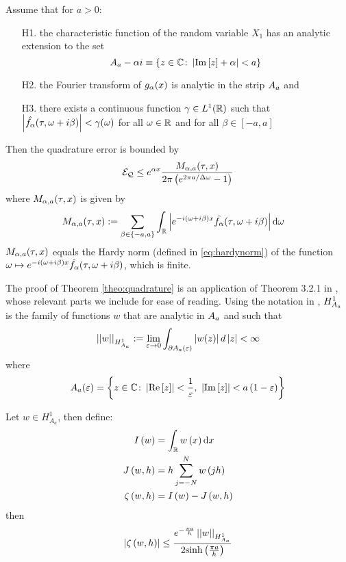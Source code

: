 \documentclass[11pt]{amsart}
\begin{document}
\begin{theorem}\label{theo:quadrature} 
Assume that for $a > 0$:
\begin{itemize}
\item[H1.] the characteristic function of the random variable $X_1$ has an analytic extension to the set $$A_{a}-\alpha i \equiv \left\{z\in \mathbb{C} \colon \left| {\mathrm{Im}\left[z\right]+\alpha} \right|<a\right\}$$
\item[H2.] the Fourier transform of $g_{\alpha}(x)$ is analytic in the strip $A_{a}$ and
\item[H3.] there exists a continuous function $\gamma \in L^1(\mathbb{R})$ such that  $\left| {\hat{f_{\alpha}}(\tau,\omega+i \beta)} \right|<\gamma(\omega)$ for all $\omega\in \mathbb{R}$ and for all $\beta \in [-a,a]$
\end{itemize}
Then the quadrature error is bounded by
\begin{equation*}
\mathcal{E_Q} \leq e^{\alpha x} \frac{M_{\alpha,a}(\tau,x) }{2\pi\left( {e^{2\pi a/\Delta\omega}-1} \right)}
\end{equation*}
where $M_{\alpha,a}(\tau,x)$ is given by
\begin{align}\label{eq:defM}
M_{\alpha,a}(\tau,x)&:=\sum_{\beta \in \{-a,a\}}\int_{\mathbb{R}}\left| {e^{-i\left( {\omega + i\beta} \right) x}\hat{f_{\alpha}}(\tau,\omega+i \beta)} \right| \textrm{d} \omega
\end{align}
$M_{\alpha,a}(\tau,x)$ equals the Hardy norm (defined in \eqref{eq:hardynorm}) of the function $\omega \mapsto e^{-i\left( {\omega + i\beta} \right) x}\hat{f_{\alpha}}(\tau,\omega+i \beta)$, which
is finite.
\end{theorem}

The proof of Theorem \ref{theo:quadrature} is an application of Theorem 3.2.1 in \cite{stenger2012numerical},
whose relevant parts we include for ease of reading. Using the notation in \cite{stenger2012numerical}, $H^1_{A_{a}}$ is the family of functions $w$ that are
 analytic in $A_{a}$ and such that 
\begin{equation}\label{eq:hardynorm}
\left| {\left| {{w}} \right|} \right|_{H^1_{A_a}}:= \lim_{\varepsilon\to 0} \int_{\partial A_{a}(\varepsilon)} \left| {w(z)} \right|d\left| {z} \right| < \infty
\end{equation}
 where 
 $$A_{a}(\varepsilon) = \left\{z\in \mathbb{C}\colon \left| {\mathrm{Re}\left[z\right]} \right|<\frac1{\varepsilon},\ \left| {\mathrm{Im}\left[z\right]} \right| < a \left( {1-\varepsilon} \right)\right\}$$
\begin{lemma}\label{lem:stenger}
Let $w \in H^1_{A_a}$,
then define:
\begin{align}
I \left( {w} \right) &= \int_{\mathbb{R}} w \left( {x} \right) \textrm{d} x \\
J \left( {w,h} \right) &= h \displaystyle\sum\limits_{j=-N}^{N} w \left( {jh} \right) \\
\zeta \left( {w,h} \right) &= I \left( {w} \right)- J \left( {w,h} \right)
\end{align}
then
\begin{align}
\left| {\zeta \left( {w,h} \right)} \right| \leq \frac{e^{-\frac{\pi a}{h}} \left| {\left| {{w}} \right|} \right|_{H^1_{A_a}}}{2 \mathrm{sinh} \left( {\frac{\pi a}{h}} \right)}
\end{align}
\end{lemma}
\end{document}
